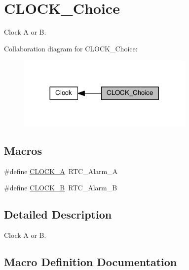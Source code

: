 \hypertarget{group___c_l_o_c_k___choice}{}\section{C\+L\+O\+C\+K\+\_\+\+Choice}
\label{group___c_l_o_c_k___choice}


Clock A or B.  


Collaboration diagram for C\+L\+O\+C\+K\+\_\+\+Choice\+:\nopagebreak
\begin{figure}[H]
\begin{center}
\leavevmode
\includegraphics[width=245pt]{d0/d72/group___c_l_o_c_k___choice}
\end{center}
\end{figure}
\subsection*{Macros}
\begin{DoxyCompactItemize}
\item 
\#define \hyperlink{group___c_l_o_c_k___choice_gaa6850d52f4718938783dcc4b932f78ac}{C\+L\+O\+C\+K\+\_\+A}~R\+T\+C\+\_\+\+Alarm\+\_\+A
\item 
\#define \hyperlink{group___c_l_o_c_k___choice_gaa955d6afa2e3fcc5dc68064b9cd5161f}{C\+L\+O\+C\+K\+\_\+B}~R\+T\+C\+\_\+\+Alarm\+\_\+B
\end{DoxyCompactItemize}


\subsection{Detailed Description}
Clock A or B. 



\subsection{Macro Definition Documentation}
